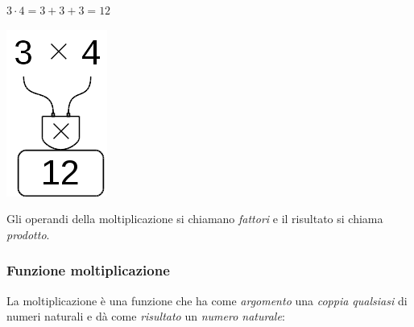\begin{minipage}{0.80\textwidth}
 \centering
 \(3 \cdot 4 = 3 + 3 + 3 = 12\)

% 
\end{minipage}%
\begin{minipage}{0.15\textwidth}
 \centering
\begin{inaccessibleblock}[]
 \includegraphics[scale=0.35]{img/op_mol.png}
\end{inaccessibleblock}
\end{minipage}%

Gli operandi della moltiplicazione si chiamano \emph{fattori} e il 
risultato si chiama \emph{prodotto}.

\subsubsection{Funzione moltiplicazione}

La moltiplicazione è una funzione che ha come \emph{argomento} una \emph{coppia 
qualsiasi} di numeri naturali e dà come \emph{risultato} un \emph{numero 
naturale}:

\vspace{1em}
\begin{minipage}[t]{.48\textwidth}
\begin{center}
\begin{inaccessibleblock}
\end{inaccessibleblock}
\end{center}
\end{minipage}
\hfill
\begin{minipage}[t]{.48\textwidth}
\begin{center}
\begin{inaccessibleblock}
\end{inaccessibleblock}
\end{center}
\end{minipage}

